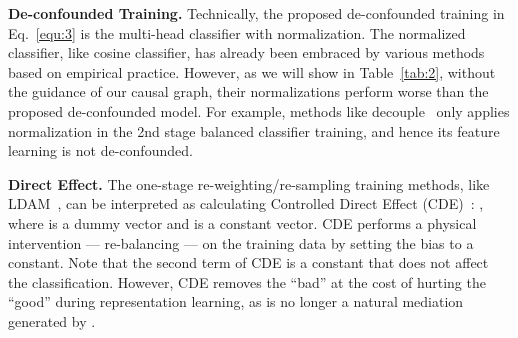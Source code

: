 \documentclass{article}
\begin{document}
\textbf{De-confounded Training.} Technically, the proposed de-confounded training in Eq.~\eqref{equ:3} is the multi-head classifier with normalization. The normalized classifier, like cosine classifier, has already been embraced by various methods~\cite{gidaris2018dynamic, qi2018low, liu2019large, kang2019decoupling} based on empirical practice. However, as we will show in Table~\ref{tab:2}, without the guidance of our causal graph, their normalizations perform worse than the proposed de-confounded model. For example, methods like decouple~\cite{kang2019decoupling} only applies normalization in the 2nd stage balanced classifier training, and hence its feature learning is not de-confounded.

\textbf{Direct Effect.} The one-stage re-weighting/re-sampling training methods, like LDAM~\cite{cao2019learning}, can be interpreted as calculating Controlled Direct Effect (CDE)~\cite{pearl2016causal}: , where  is a dummy vector and  is a constant vector. CDE performs a physical intervention --- re-balancing --- on the training data by setting the bias  to a constant. Note that the second term of CDE is a constant that does not affect the classification. However, CDE removes the ``bad'' at the cost of hurting the ``good'' during representation learning, as  is no longer a natural mediation generated by .
\end{document}
